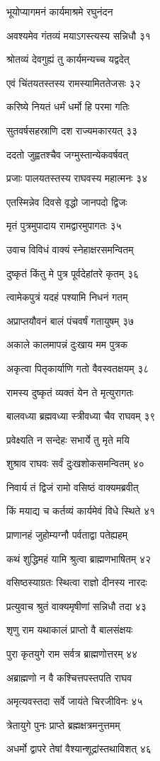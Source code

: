 भूयोप्यागमनं कार्यमाश्रमे रघुनंदन

अवश्यमेव गंतव्यं मयाऽगस्त्यस्य सन्निधौ ३१

श्रोतव्यं देवगुह्यं तु कार्यमन्यच्च यद्वदेत्

एवं चिंतयतस्तस्य रामस्यामिततेजसः ३२

करिष्ये नियतं धर्मं धर्मो हि परमा गतिः

सुतवर्षसहस्राणि दश राज्यमकारयत् ३३

ददतो जुह्वतश्चैव जग्मुस्तान्येकवर्षवत्

प्रजाः पालयतस्तस्य राघवस्य महात्मनः ३४

एतस्मिन्नेव दिवसे वृद्धो जानपदो द्विजः

मृतं पुत्रमुपादाय रामद्वारमुपागतः ३५

उवाच विविधं वाक्यं स्नेहाक्षरसमन्वितम्

दुष्कृतं किंतु मे पुत्र पूर्वदेहांतरे कृतम् ३६

त्वामेकपुत्रं यदहं पश्यामि निधनं गतम्

अप्राप्तयौवनं बालं पंचवर्षं गतायुषम् ३७

अकाले कालमापन्नं दुःखाय मम पुत्रक

अकृत्वा पितृकार्याणि गतो वैवस्वतक्षयम् ३८

रामस्य दुष्कृतं व्यक्तं येन ते मृत्युरागतः

बालवध्या ब्रह्मवध्या स्त्रीवध्या चैव राघवम् ३९

प्रवेक्ष्यति न सन्देहः सभार्ये तु मृते मयि

शुश्राव राघवः सर्वं दुःखशोकसमन्वितम् ४०

निवार्य तं द्विजं रामो वसिष्ठं वाक्यमब्रवीत्

किं मयाद्य च कर्तव्यं कार्यमेवं विधे स्थिते ४१

प्राणानहं जुहोम्यग्नौ पर्वताद्वा पतेह्यहम्

कथं शुद्धिमहं यामि श्रुत्वा ब्राह्मणभाषितम् ४२

वसिष्ठस्याग्रतः स्थित्वा राज्ञो दीनस्य नारदः

प्रत्युवाच श्रुतं वाक्यमृषीणां सन्निधौ तदा ४३

शृणु राम यथाकालं प्राप्तो वै बालसंक्षयः

पुरा कृतयुगे राम सर्वत्र ब्राह्मणोत्तरम् ४४

अब्राह्मणो न वै कश्चित्तपस्तपति राघव

अमृत्यवस्तदा सर्वे जायंते चिरजीविनः ४५

त्रेतायुगे पुनः प्राप्ते ब्रह्मक्षत्रमनुत्तमम्

अधर्मो द्वापरे तेषां वैश्यान्शूद्रांस्तथाविशत् ४६

